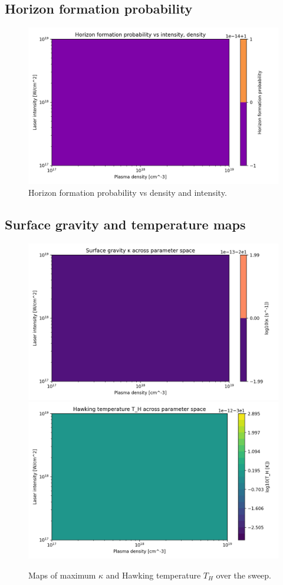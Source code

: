 \documentclass[11pt]{article}
\begin{document}
\subsection{Horizon formation probability}
\begin{figure}[h]
  \centering
  \includegraphics[width=0.9\linewidth]{figures/horizon_analysis_probability_map.png}
  \caption{Horizon formation probability vs density and intensity.}
\end{figure}

\subsection{Surface gravity and temperature maps}
\begin{figure}[h]
  \centering
  \includegraphics[width=0.48\linewidth]{figures/horizon_analysis_kappa_map.png}\hfill
  \includegraphics[width=0.48\linewidth]{figures/horizon_analysis_TH_map.png}
  \caption{Maps of maximum $\kappa$ and Hawking temperature $T_H$ over the sweep.}
\end{figure}
\end{document}
